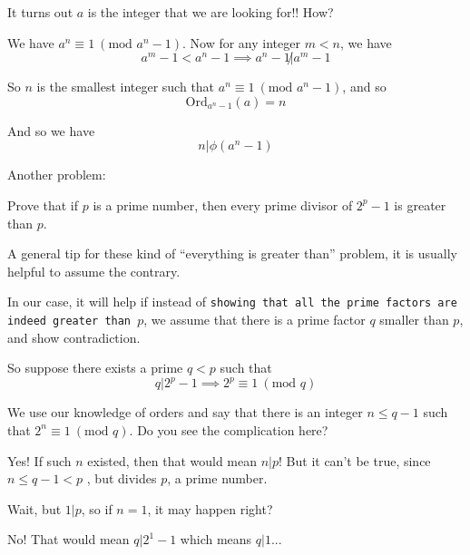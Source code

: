 \documentclass[compress]{beamer}
\newcommand{\gap}{\pause\vspace{1em}}
\begin{document}
\begin{frame}
    It turns out $a$ is the integer that we are looking for!! How?

    \gap

    We have $a^n \equiv 1 \ (\text{mod } a^n-1)$. Now for any integer $m < n$,
    we have 
    \[a^m -1 < a^n-1 \implies a^n-1\not| a^m-1\]

    \pause

    So $n$ is the smallest integer such that $a^n \equiv 1 \ (\text{mod }
    a^n-1)$, and so 
    \textcolor{NordRed}{\[\text{Ord}_{a^n-1}(a) = n\] }

    \gap

    And so we have 
\[n \left| \phi(a^n-1)\right.\] 
\end{frame}

\begin{frame}
    Another problem:

    \vspace{1em}

    \textcolor{NordOrange}{Prove that if $p$ is a prime number, then every
    prime divisor of $2^p-1$ is greater than $p$.}

    \gap

    A general tip for these kind of ``everything is greater than'' problem, it
    is usually helpful to assume the contrary. 

    \gap

    In our case, it will help if instead of \texttt{showing that all the prime
        factors are indeed greater than $p$}, \textcolor{NordBrightBlue}{we assume
    that there is a prime factor $q$ smaller than $p$}, and show contradiction.
\end{frame}

\begin{frame}
    So suppose there exists a prime $q<p$ such that 
    \[q|2^p-1 \implies 2^p \equiv 1 \ (\text{mod } q)\] 

    \gap

    We use our knowledge of orders and say that
    \textcolor{NordBrightBlue}{there is an integer $n\le q-1$ such that $2^n
    \equiv 1 \ (\text{mod } q)$}. Do you see the complication here?

    \gap

    Yes! If such $n$ existed, then \textcolor{NordRed}{that would mean $n|p$}!
    But it can't be true, since \textcolor{NordRed}{$n\le q-1 < p$ , but
    divides $p$}, a prime number. 

    \gap

    Wait, but $1|p$, so if $n=1$, it may happen right? 

    \gap

    No! That would mean \textcolor{NordRed}{$q|2^1-1$} which means $q|1$...
\end{frame}
\end{document}
